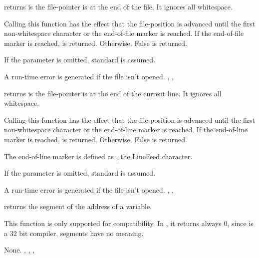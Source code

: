 \documentclass{report}
\begin{document}


{ returns  is the file-pointer is at the end of the
file. It ignores all whitespace.

Calling this function has the effect that the file-position is advanced
until the first non-whitespace character or the end-of-file marker is
reached.
If the end-of-file marker is reached,  is returned. Otherwise,
False is returned.

If the parameter  is omitted, standard  is assumed.
}
{A run-time error is generated if the file  isn't opened.}
{, , }



{ returns  is the file-pointer is at the end of the
current line. It ignores all whitespace.

Calling this function has the effect that the file-position is advanced
until the first non-whitespace character or the end-of-line marker is
reached.
If the end-of-line marker is reached,  is returned. Otherwise,
False is returned.

The end-of-line marker is defined as , the LineFeed character.

If the parameter  is omitted, standard  is assumed.}
{A run-time error is generated if the file  isn't opened.}
{, , }



{ returns the segment of the address of a variable. 

This function is only supported for compatibility. In \fpc, it 
returns always 0, since \fpc is a 32 bit compiler, segments have no meaning.
}
{None.}
{, , , }


\end{document}
